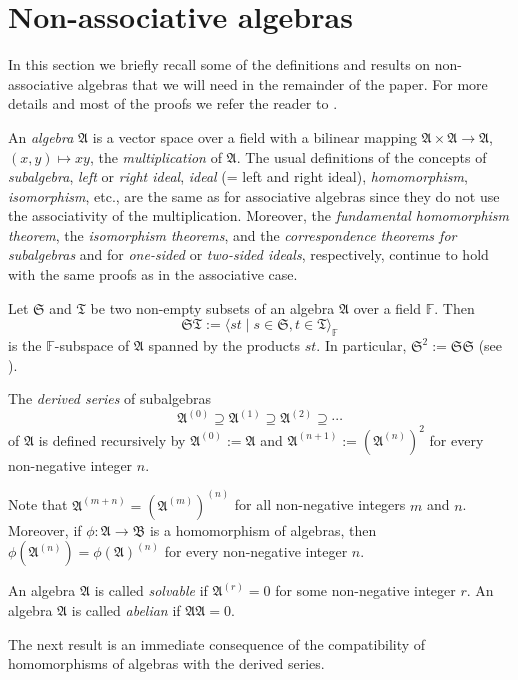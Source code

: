 \documentclass{amsart}
\numberwithin{equation}{section}
\newcommand{\F}{\mathbb{F}}
\newcommand{\af}{\mathfrak{A}}
\newcommand{\Sf}{\mathfrak{S}}
\newcommand{\tf}{\mathfrak{T}}
\newcommand{\Bf}{\mathfrak{B}}
\begin{document}

\section{Non-associative algebras}


In this section we briefly recall some of the definitions and results on non-associative
algebras that we will need in the remainder of the paper. For more details and most of the
proofs we refer the reader to \cite{S}.

An {\em algebra\/} $\af$ is a vector space over a field with a bilinear mapping $\af\times
\af\to\af$, $(x,y)\mapsto xy$, the {\em multiplication\/} of $\af$. The usual definitions of
the concepts of {\em subalgebra\/}, {\em left\/} or {\em right ideal\/}, {\em ideal\/} (=
left and right ideal), {\em homomorphism\/}, {\em isomorphism\/}, etc., are the same as
for associative algebras since they do not use the associativity of the multiplication. Moreover,
the {\em fundamental homomorphism theorem\/}, the {\em isomorphism theorems\/}, and
the {\em correspondence theorems for subalgebras\/} and for {\em one-sided\/} or {\em
two-sided ideals\/}, respectively, continue to hold with the same proofs as in the associative
case.

Let $\Sf$ and $\tf$ be two non-empty subsets of an algebra $\af$ over a field $\F$. Then
$$\Sf\tf:=\langle st\mid s\in\Sf,t\in\tf\rangle_\F$$ is the $\F$-subspace of $\af$ spanned
by the products $st$. In particular, $\Sf^2:=\Sf\Sf$ (see \cite[p.\ 9]{S}).

The {\em derived series\/} of subalgebras $$\af^{(0)}\supseteq\af^{(1)}\supseteq\af^{(2)}
\supseteq\cdots$$ of $\af$ is defined recursively by $\af^{(0)}:=\af$ and $\af^{(n+1)}:=
(\af^{(n)})^2$ for every non-negative integer $n$.

Note that $\af^{(m+n)}=(\af^{(m)})^{(n)}$ for all non-negative integers $m$ and $n$.
Moreover, if $\phi:\af\to\Bf$ is a homomorphism of algebras, then $\phi(\af^{(n)})=\phi
(\af)^{(n)}$ for every non-negative integer $n$.

An algebra $\af$ is called {\em solvable\/} if $\af^{(r)}=0$ for some non-negative integer
$r$. An algebra $\af$ is called {\em abelian\/} if $\af\af=0$.

The next result is an immediate consequence of the compatibility of homomorphisms of algebras
with the derived series.
\end{document}
